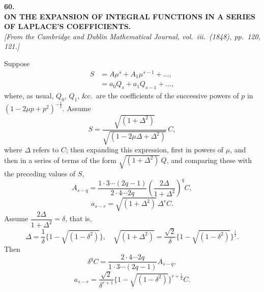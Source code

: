 \documentclass[11pt]{article}
\begin{document}
\bigskip

\begin{center}
\textbf{\large 60.}\\[0.7em]
\textbf{\large ON THE EXPANSION OF INTEGRAL FUNCTIONS IN A SERIES}\\[0.3em]
\textbf{\large OF LAPLACE'S COEFFICIENTS.}\\[0.5em]
\textit{[From the Cambridge and Dublin Mathematical Journal, vol.~iii.\ (1848), pp.~120, 121.]}
\end{center}

\medskip

\noindent Suppose
\begin{equation}
\begin{aligned}
S &= A\mu^{s} + A_{1}\mu^{s-1} + \ldots,\\
  &= a_{0}Q_{s} + a_{1}Q_{s-1} + \ldots,
\end{aligned}
\tag{1}
\end{equation}
where, as usual, $Q_{0}$, $Q_{1}$, \&c.\ are the coefficients of the successive powers of $p$ in
$(1 - 2\mu p + p^{2})^{-\frac{1}{2}}$. Assume
\[
S = \frac{\sqrt{(1 + \Delta^{2})}}{\sqrt{(1 - 2\mu\Delta + \Delta^{2})}}\,C \tag{2},
\]
where $\Delta$ refers to $C$; then expanding this expression, first in powers of $\mu$, and then
in a series of terms of the form $\sqrt{(1+\Delta^{2})}\,Q$, and comparing these with the preceding
values of $S$,
\[
A_{s-q} =
\frac{1\cdot3\cdots(2q-1)}{2\cdot4\cdots2q}
\left(\frac{2\Delta}{1+\Delta^{2}}\right)^{q}C,
\]
\[
a_{s-r} = \sqrt{(1+\Delta^{2})}\,\Delta^{r}C. \tag{3}
\]
Assume $\dfrac{2\Delta}{1+\Delta^{2}} = \delta$, that is,
\[
\Delta = \frac{1}{\delta}\{1-\sqrt{(1-\delta^{2})}\},\quad
\sqrt{(1+\Delta^{2})} =
\frac{\sqrt{2}}{\delta}\{1-\sqrt{(1-\delta^{2})}\}^{\frac{1}{2}}. \tag{4}
\]
Then
\[
\delta^{q}C =
\frac{2\cdot4\cdots2q}{1\cdot3\cdots(2q-1)}A_{s-q},
\]
\[
a_{s-r} =
\frac{\sqrt{2}}{\delta^{r+1}}\{1-\sqrt{(1-\delta^{2})}\}^{r+\frac{1}{2}}C. \tag{5}
\]

\bigskip
\end{document}
